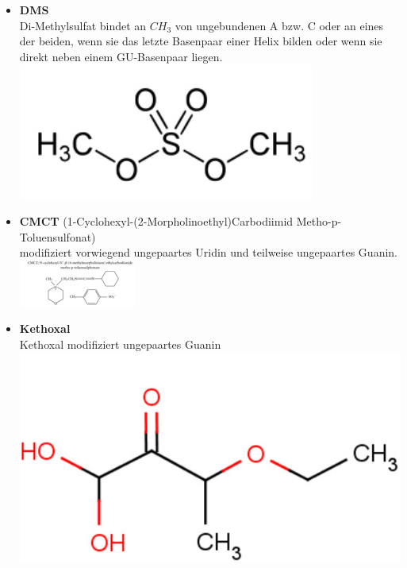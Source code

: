 \begin{itemize}

\item \textbf{DMS} \\
Di-Methylsulfat bindet an $CH_3$ von ungebundenen A bzw. C oder an eines der beiden, wenn sie das letzte Basenpaar einer Helix bilden oder wenn sie direkt neben einem GU-Basenpaar liegen. \\ \includegraphics[scale=0.3]{lectures/160527/pix/Dimethylsulfat.jpg} \\

\item \textbf{CMCT} (1-Cyclohexyl-(2-Morpholinoethyl)Carbodiimid Metho-p-Toluensulfonat)  \\
modifiziert vorwiegend ungepaartes Uridin und teilweise ungepaartes Guanin. \\
\includegraphics[scale=1]{lectures/160527/pix/CMCT.jpg} \\

\item \textbf{Kethoxal} \\
Kethoxal modifiziert ungepaartes Guanin \\
\includegraphics[scale=0.3]{lectures/160527/pix/Kethoxal.jpg}
\end{itemize}

